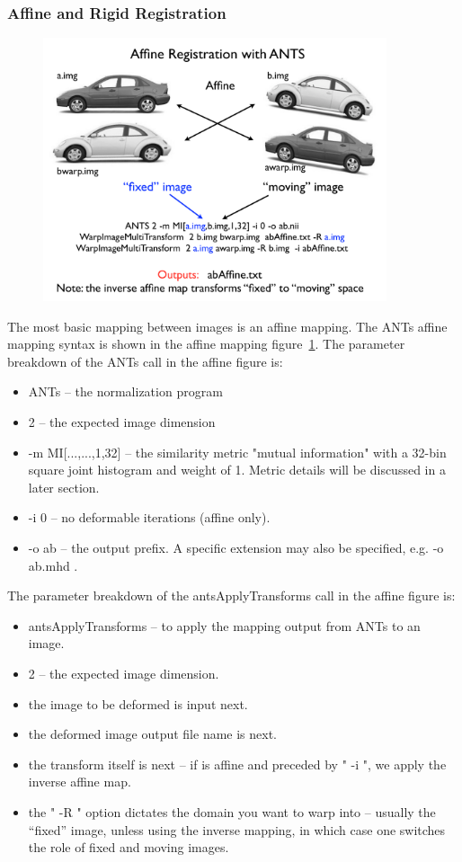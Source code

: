 \documentclass{InsightArticle}
\begin{document}
\subsubsection{Affine and Rigid Registration}
\begin{figure}
\includegraphics[width=0.9\textwidth]{./Figures/ANTSanatomy.pdf} 
\vspace{-0.1in}
\label{fig:aff}
\end{figure}
The most basic mapping between images is an affine mapping. The ANTs 
affine mapping syntax is shown in the affine mapping figure~\ref{fig:aff}. The
parameter breakdown of the ANTs call in the affine figure is:
\begin{itemize}
\item  ANTs -- the normalization program
\item 2 -- the expected image dimension
\item -m MI[...,...,1,32] -- the similarity metric "mutual information" with a 32-bin square joint histogram and weight of 1.  
Metric details will be discussed in a later section. 
\item -i 0 -- no deformable iterations (affine only).
\item -o ab -- the output prefix.  A specific extension may also be specified, e.g.   -o ab.mhd  .
\end{itemize}
The parameter breakdown of the antsApplyTransforms call in the affine figure is:
\begin{itemize}
\item antsApplyTransforms -- to apply the mapping output from ANTs to an image.
\item 2 -- the expected image dimension.
\item the image to be deformed is input next.
\item the deformed image output file name is next.
\item the transform itself is next -- if is affine and preceded by " -i ", we apply the inverse affine map.
\item the " -R " option dictates the domain you want to warp into -- usually the ``fixed'' image, unless using the inverse mapping, in which case one switches the role of fixed and moving images. 
\end{itemize}
\end{document}
